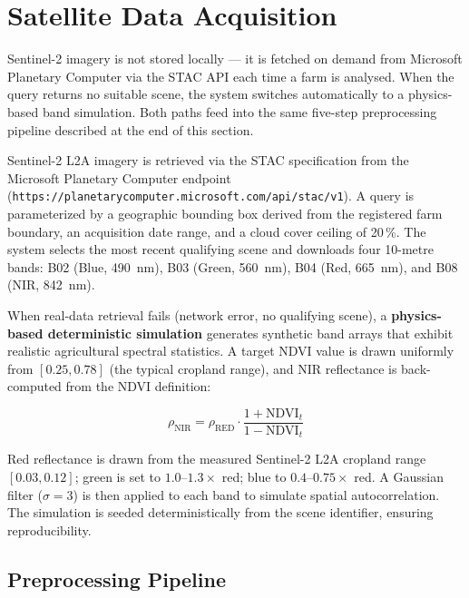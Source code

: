 \documentclass[12pt,a4paper,oneside]{report}
\begin{document}
\section{Satellite Data Acquisition}

Sentinel-2 imagery is not stored locally — it is fetched on demand from Microsoft Planetary Computer via the STAC API each time a farm is analysed. When the query returns no suitable scene, the system switches automatically to a physics-based band simulation. Both paths feed into the same five-step preprocessing pipeline described at the end of this section.

Sentinel-2 L2A imagery is retrieved via the STAC specification \cite{lewis2021stac}
from the Microsoft Planetary Computer endpoint
(\texttt{https://planetarycomputer.microsoft.com/api/stac/v1}). A query is
parameterized by a geographic bounding box derived from the registered farm boundary,
an acquisition date range, and a cloud cover ceiling of 20\,\%. The system selects
the most recent qualifying scene and downloads four 10-metre bands:
B02 (Blue, 490~nm), B03 (Green, 560~nm), B04 (Red, 665~nm), and B08 (NIR, 842~nm).

When real-data retrieval fails (network error, no qualifying scene), a
\textbf{physics-based deterministic simulation} generates synthetic band arrays that
exhibit realistic agricultural spectral statistics. A target NDVI value is drawn
uniformly from $[0.25, 0.78]$ (the typical cropland range), and NIR reflectance is
back-computed from the NDVI definition:

\begin{equation}
\rho_\mathrm{NIR} = \rho_\mathrm{RED} \cdot \frac{1 + \mathrm{NDVI}_t}{1 - \mathrm{NDVI}_t}
\label{eq:nir_sim}
\end{equation}

Red reflectance is drawn from the measured Sentinel-2 L2A cropland range $[0.03, 0.12]$;
green is set to $1.0$--$1.3\times$ red; blue to $0.4$--$0.75\times$ red.
A Gaussian filter ($\sigma = 3$) is then applied to each band to simulate spatial
autocorrelation. The simulation is seeded deterministically from the scene identifier,
ensuring reproducibility.

\subsection{Preprocessing Pipeline}
\end{document}
